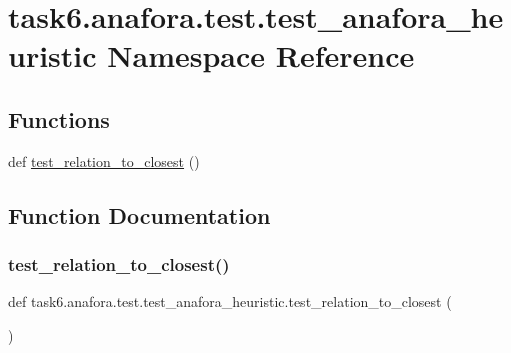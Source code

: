 \hypertarget{namespacetask6_1_1anafora_1_1test_1_1test__anafora__heuristic}{}\section{task6.\+anafora.\+test.\+test\+\_\+anafora\+\_\+heuristic Namespace Reference}
\label{namespacetask6_1_1anafora_1_1test_1_1test__anafora__heuristic}
\subsection*{Functions}
\begin{DoxyCompactItemize}
\item 
def \hyperlink{namespacetask6_1_1anafora_1_1test_1_1test__anafora__heuristic_a41fd71f229370c1be6e142e572c8b129}{test\+\_\+relation\+\_\+to\+\_\+closest} ()
\end{DoxyCompactItemize}


\subsection{Function Documentation}
\mbox{\label{namespacetask6_1_1anafora_1_1test_1_1test__anafora__heuristic_a41fd71f229370c1be6e142e572c8b129}} 
\subsubsection{\texorpdfstring{test\+\_\+relation\+\_\+to\+\_\+closest()}{test\_relation\_to\_closest()}}
{\footnotesize\ttfamily def task6.\+anafora.\+test.\+test\+\_\+anafora\+\_\+heuristic.\+test\+\_\+relation\+\_\+to\+\_\+closest (\begin{DoxyParamCaption}{ }\end{DoxyParamCaption})}

